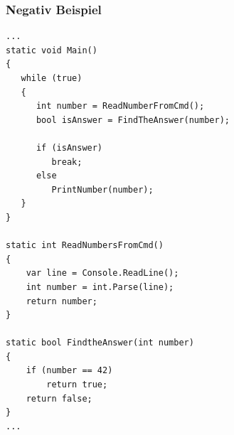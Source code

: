 \documentclass[11pt]{article}
\begin{document}
\subsubsection{Negativ Beispiel}
\label{sec:orgheadline53}
\begin{verbatim}
...
static void Main()
{
   while (true)
   {
      int number = ReadNumberFromCmd();
      bool isAnswer = FindTheAnswer(number);

      if (isAnswer)
         break;
      else
         PrintNumber(number);
   }
}

static int ReadNumbersFromCmd()
{
    var line = Console.ReadLine();
    int number = int.Parse(line);
    return number;
}

static bool FindtheAnswer(int number)
{ 
    if (number == 42)
        return true;
    return false;
}
...
\end{verbatim}
\end{document}
